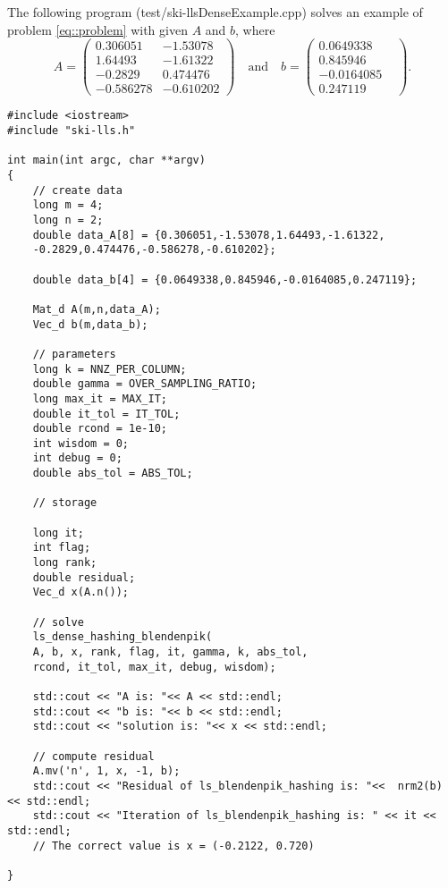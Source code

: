 \documentclass[english,11pt]{article}
\begin{document}
The following program (test/ski-llsDenseExample.cpp) solves an example of problem \eqref{eq::problem} with given $A$ and $b$, where 
\begin{equation}
A = \begin{pmatrix}
0.306051 & -1.53078 \\
1.64493 & -1.61322 \\
-0.2829 & 0.474476	\\
-0.586278 & -0.610202 
\end{pmatrix} \quad \text{and} \quad 
b = \begin{pmatrix}
0.0649338 \\
0.845946 \\
-0.0164085\\
0.247119 & 
\end{pmatrix}.
\end{equation}

\begin{lstlisting}[breaklines=true, showstringspaces=false]
#include <iostream>
#include "ski-lls.h" 

int main(int argc, char **argv)
{
	// create data
	long m = 4;
	long n = 2;
	double data_A[8] = {0.306051,-1.53078,1.64493,-1.61322,
	-0.2829,0.474476,-0.586278,-0.610202}; 

	double data_b[4] = {0.0649338,0.845946,-0.0164085,0.247119};

	Mat_d A(m,n,data_A);
	Vec_d b(m,data_b);

	// parameters
	long k = NNZ_PER_COLUMN;
	double gamma = OVER_SAMPLING_RATIO;
	long max_it = MAX_IT;
	double it_tol = IT_TOL;
	double rcond = 1e-10;
	int wisdom = 0;
	int debug = 0;
	double abs_tol = ABS_TOL;

	// storage

	long it;
	int flag;
	long rank;
	double residual;   
	Vec_d x(A.n());

	// solve
	ls_dense_hashing_blendenpik(
	A, b, x, rank, flag, it, gamma, k, abs_tol, 
	rcond, it_tol, max_it, debug, wisdom);

	std::cout << "A is: "<< A << std::endl;
	std::cout << "b is: "<< b << std::endl;
	std::cout << "solution is: "<< x << std::endl;

	// compute residual
	A.mv('n', 1, x, -1, b); 
	std::cout << "Residual of ls_blendenpik_hashing is: "<<  nrm2(b) << std::endl;
	std::cout << "Iteration of ls_blendenpik_hashing is: " << it << std::endl;
	// The correct value is x = (-0.2122, 0.720)

}
\end{lstlisting}
\end{document}
